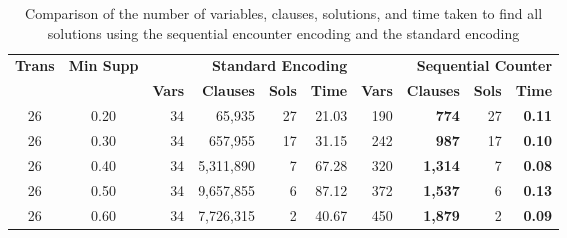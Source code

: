 \begin{table}[H]
    \centering
    \caption{Comparison of the number of variables, clauses, solutions, and time taken to find all solutions using the sequential encounter encoding and the standard encoding}
    \label{tab:4_1}
    \begin{tabular}{|c|c|r|r|r|r|r|r|r|r|}
        \hline
        \multirow{2}{*}{\textbf{Trans}} & \multirow{2}{*}{\textbf{Min Supp}} & \multicolumn{4}{r|}{\textbf{Standard Encoding}} & \multicolumn{4}{r|}{\textbf{Sequential Counter}}                                                                                                    \\ \cline{3-10}
                                        &                                    & \textbf{Vars}                                   & \textbf{Clauses}                                 & \textbf{Sols} & \textbf{Time} & \textbf{Vars} & \textbf{Clauses} & \textbf{Sols} & \textbf{Time} \\ \hline
        26                              & 0.20                               & 34                                              & 65,935                                           & 27            & 21.03         & 190           & \textbf{ 774}    & 27            & \textbf{0.11} \\ \hline
        26                              & 0.30                               & 34                                              & 657,955                                          & 17            & 31.15         & 242           & \textbf{ 987}    & 17            & \textbf{0.10} \\ \hline
        26                              & 0.40                               & 34                                              & 5,311,890                                        & 7             & 67.28         & 320           & \textbf{1,314}   & 7             & \textbf{0.08} \\ \hline
        26                              & 0.50                               & 34                                              & 9,657,855                                        & 6             & 87.12         & 372           & \textbf{1,537}   & 6             & \textbf{0.13} \\ \hline
        26                              & 0.60                               & 34                                              & 7,726,315                                        & 2             & 40.67         & 450           & \textbf{1,879}   & 2             & \textbf{0.09} \\ \hline

\end{tabular}
\end{table}
